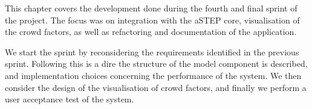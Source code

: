 This chapter covers the development done during the fourth and final sprint of the project. The focus was on integration with the aSTEP core, visualisation of the crowd factors, as well as refactoring and documentation of the application.

We start the sprint by reconsidering the requirements identified in the previous sprint. Following this is a dire the structure of the model component is described, and implementation choices concerning the performance of the system. We then consider the design of the visualisation of crowd factors, and finally we perform a user acceptance test of the system.